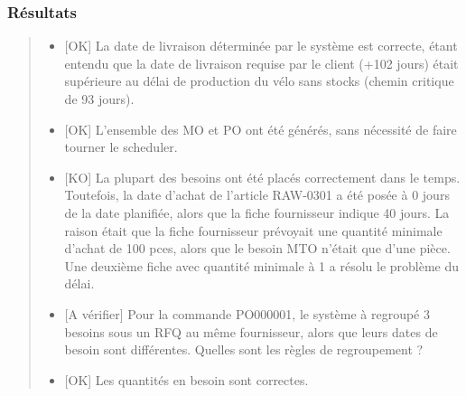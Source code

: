 \documentclass[letterpaper,10pt,french]{sphinxmanual}
\begin{document}
\subsubsection{Résultats}
\label{\detokenize{readthedocs/tests/A1_MTO_MTS:resultats}}\begin{quote}

\begin{itemize}
\item {} 
{[}OK{]} La date de livraison déterminée par le système est correcte, étant entendu que la date de livraison requise par le client (+102 jours) était supérieure au délai de production du vélo sans stocks (chemin critique de 93 jours).

\item {} 
{[}OK{]} L’ensemble des MO et PO ont été générés, sans nécessité de faire tourner le scheduler.

\item {} 
{[}KO{]} La plupart des besoins ont été placés correctement dans le temps. Toutefois, la date d’achat de l’article RAW-0301 a été posée à 0 jours de la date planifiée, alors que la fiche fournisseur indique 40 jours. La raison était que la fiche fournisseur prévoyait une quantité minimale d’achat de 100 pces, alors que le besoin MTO n’était que d’une pièce. Une deuxième fiche avec quantité minimale à 1 a résolu le problème du délai.

\item {} 
{[}A vérifier{]} Pour la commande PO000001, le système à regroupé 3 besoins sous un RFQ au même fournisseur, alors que leurs dates de besoin sont différentes. Quelles sont les règles de regroupement ?

\item {} 
{[}OK{]} Les quantités en besoin sont correctes.

\end{itemize}
\end{quote}
\end{document}
